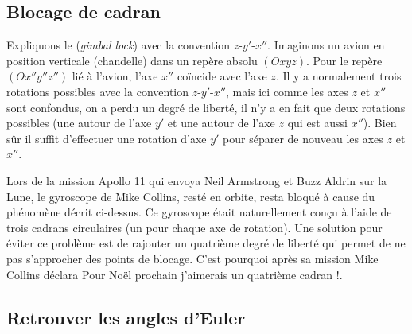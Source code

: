 \documentclass[11pt,class=report,crop=false]{standalone}
\begin{document}
\subsection{Blocage de cadran}

Expliquons le  (\emph{gimbal lock}) avec la convention $z$-$y'$-$x''$.
Imaginons un avion en position verticale (\og{}chandelle\fg{}) dans un repère absolu $(Oxyz)$.
Pour le repère $(Ox''y''z'')$ lié à l'avion, l'axe $x''$ coïncide avec l'axe $z$. 
Il y a normalement trois rotations possibles avec la convention $z$-$y'$-$x''$, mais ici comme les axes $z$ et $x''$ sont confondus, on a perdu un degré de liberté, il n'y a en fait que deux rotations possibles (une autour de l'axe $y'$ et une autour de l'axe $z$ qui est aussi $x''$). Bien sûr il suffit d'effectuer une rotation d'axe $y'$ pour séparer de nouveau les axes $z$ et $x''$.



Lors de la mission Apollo 11 qui envoya Neil Armstrong et Buzz Aldrin sur la Lune, le gyroscope  de Mike Collins, resté en orbite, resta bloqué à cause du phénomène décrit ci-dessus. Ce gyroscope était naturellement conçu à l'aide de trois cadrans circulaires (un pour chaque axe de rotation). Une solution pour éviter ce problème est de rajouter un quatrième degré de liberté qui permet de ne pas s'approcher des points de blocage. C'est pourquoi après sa mission Mike Collins déclara \og{}Pour Noël prochain j'aimerais un quatrième cadran !\fg{}.



\subsection{Retrouver les angles d'Euler}
\end{document}

